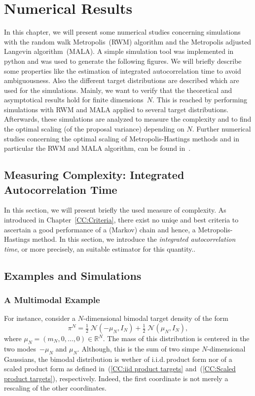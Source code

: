 \chapter{Numerical Results}
\label{Numerical Results}

In this chapter, we will present some numerical studies concerning simulations with the random walk Metropolis~(RWM) algorithm and the Metropolis adjusted Langevin algorithm~(MALA). A simple simulation tool was implemented in python and was used to generate the following figures. We will briefly describe some properties like the estimation of integrated autocorrelation time to avoid ambiguousness. Also the different target distributions are described which are used for the simulations. Mainly, we want to verify that the theoretical and asymptotical results hold for finite dimensions~$N$. This is reached by performing simulations with RWM and MALA applied to several target distributions. Afterwards, these simulations are analyzed to measure the complexity and to find the optimal scaling (of the proposal variance) depending on $N$.
Further numerical studies concerning the optimal scaling of Metropolis-Hastings methods and in particular the RWM and MALA algorithm, can be found in~\autocite{Beskos2008, Gelman1996, Roberts2001}.

\section{Measuring Complexity: Integrated Autocorrelation Time}
\label{NR-integrated autocorrelation time}

In this section, we will present briefly the used measure of complexity. As introduced in Chapter~\ref{CC:Criteria}, there exist no uniqe and best criteria to ascertain a good performance of a (Markov) chain and hence, a Metropolis-Hastings method. In this section, we introduce the \textit{integrated autocorrelation time}, or more precisely, an suitable estimator for this quantity..

\section{Examples and Simulations}

\subsection{A Multimodal Example}

For instance, consider a $N$-dimensional bimodal target density of the form
\begin{equation}
 \label{NR-multimodal}
 \pi^{N} = \tfrac{1}{2} \; \mathcal{N}(-\mu_N, I_N ) +  \tfrac{1}{2} \; \mathcal{N}(\mu_N, I_N ),
\end{equation}
where $\mu_N = (m_N, 0, \dots, 0) \in \mathbb{R}^N$. The mass of this distribution is centered in the two modes~$-\mu_N$ and $\mu_N$. Although, this is the sum of two simpe $N$-dimensional Gaussians, the bimodal distribution is wether of i.i.d.\,product form nor of a scaled product form as defined in~(\ref{CC:iid product targets} and~(\ref{CC:Scaled product targets}), respectively. Indeed, the first coordinate is not merely a rescaling of the other coordinates. 

